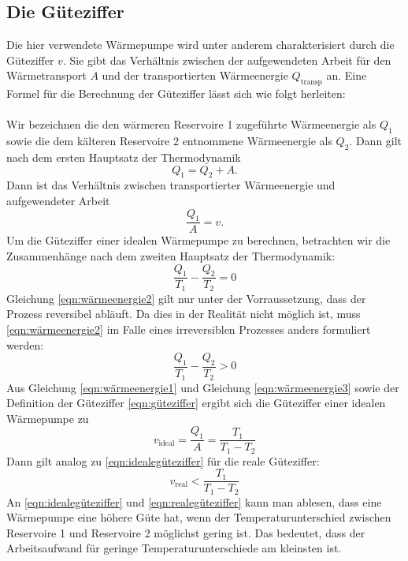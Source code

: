 \documentclass{scrartcl} %
\begin{document}
  \subsection{Die Güteziffer}
  Die hier verwendete Wärmepumpe wird unter anderem charakterisiert durch die Güteziffer $ v $. Sie gibt das Verhältnis zwischen der aufgewendeten Arbeit für den Wärmetransport
  $ A $ und der transportierten Wärmeenergie $ Q_\text{transp} $ an. Eine Formel für die Berechnung der Güteziffer lässt sich wie folgt herleiten: \\
  \\
  Wir bezeichnen die den wärmeren Reservoire 1 zugeführte Wärmeenergie als $ Q_\text{1} $ sowie die dem kälteren Reservoire 2 entnommene Wärmeenergie als $ Q_\text{2} $.
  Dann gilt nach dem ersten Hauptsatz der Thermodynamik
  \begin{equation}
    Q_\text{1} = Q_\text{2} + A.
    \label{eqn:wärmeenergie1}
  \end{equation}
  Dann ist das Verhältnis zwischen transportierter Wärmeenergie und aufgewendeter Arbeit
  \begin{equation}
    \frac{Q_\text{1}}{A} = v.
    \label{eqn:güteziffer}
  \end{equation}
  Um die Güteziffer einer idealen Wärmepumpe zu berechnen, betrachten wir die Zusammenhänge nach dem zweiten Hauptsatz der Thermodynamik:
  \begin{equation}
    \frac{Q_\text{1}}{T_\text{1}} - \frac{Q_\text{2}}{T_\text{2}} = 0
    \label{eqn:wärmeenergie2}
  \end{equation}
  Gleichung \eqref{eqn:wärmeenergie2} gilt nur unter der Vorraussetzung, dass der Prozess reversibel abläuft.
  Da dies in der Realität nicht möglich ist, muss \eqref{eqn:wärmeenergie2} im Falle eines irreversiblen Prozesses
  anders formuliert werden:
  \begin{equation}
  	\frac{Q_\text{1}}{T_\text{1}} - \frac{Q_\text{2}}{T_\text{2}} > 0
  	\label{eqn:wärmeenergie3}
  \end{equation}
	Aus Gleichung \eqref{eqn:wärmeenergie1} und Gleichung \eqref{eqn:wärmeenergie3} sowie der Definition der Güteziffer
	\eqref{eqn:güteziffer} ergibt sich die Güteziffer einer idealen Wärmepumpe zu
	\begin{equation}
		v_\text{ideal} = \frac{Q_\text{1}}{A} = \frac{T_\text{1}}{T_\text{1} - T_\text{2}}
		\label{eqn:idealegüteziffer}
	\end{equation}
	Dann gilt analog zu \eqref{eqn:idealegüteziffer} für die reale Güteziffer:
	\begin{equation}
		v_\text{real} < \frac{T_\text{1}}{T_\text{1}-T_\text{2}}
		\label{eqn:realegüteziffer}
	\end{equation}
	An \eqref{eqn:idealegüteziffer} und \eqref{eqn:realegüteziffer} kann man ablesen, dass eine Wärmepumpe eine höhere Güte hat,
	wenn der Temperaturunterschied zwischen Reservoire 1 und Reservoire 2 möglichst gering ist. Das bedeutet, dass der Arbeitsaufwand
	für geringe Temperaturunterschiede am kleinsten ist.
\end{document}
